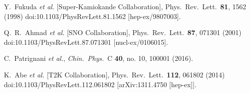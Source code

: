 \documentclass[a4 paper,12pt]{report}%
\begin{document}
\begin{thebibliography}{9}








  Y.~Fukuda {\it et al.} [Super-Kamiokande Collaboration],
  Phys.\ Rev.\ Lett.\  {\bf 81}, 1562 (1998)
  doi:10.1103/PhysRevLett.81.1562
  [hep-ex/9807003].

  Q.~R.~Ahmad {\it et al.} [SNO Collaboration],
  Phys.\ Rev.\ Lett.\  {\bf 87}, 071301 (2001)
  doi:10.1103/PhysRevLett.87.071301
  [nucl-ex/0106015].




  C.~Patrignani {\it et al.},
  {\it Chin.\ Phys.}\ C {\bf 40}, no. 10, 100001 (2016).

  K.~Abe {\it et al.} [T2K Collaboration],
  Phys.\ Rev.\ Lett.\  {\bf 112}, 061802 (2014)
  doi:10.1103/PhysRevLett.112.061802
  [arXiv:1311.4750 [hep-ex]].



\end{thebibliography}
\end{document}
